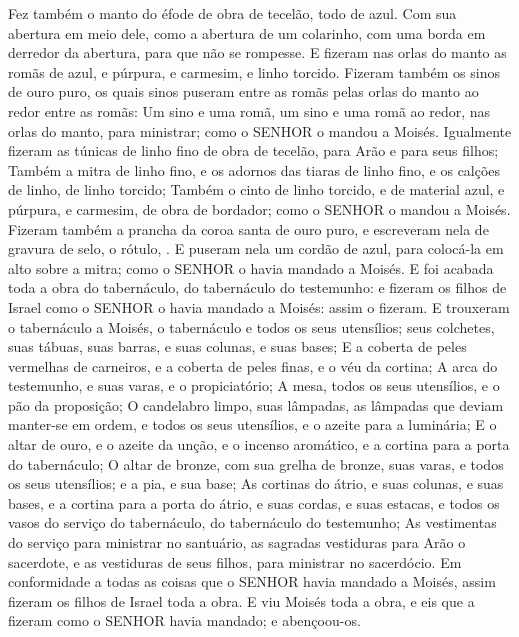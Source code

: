 {  Fez também o manto do éfode de obra de tecelão, todo de azul.
  Com sua abertura em meio dele, como a abertura de um colarinho, com uma borda em derredor da abertura, para que não se rompesse.
  E fizeram nas orlas do manto as romãs de azul, e púrpura, e carmesim, e linho torcido.
  Fizeram também os sinos de ouro puro, os quais sinos puseram entre as romãs pelas orlas do manto ao redor entre as romãs:
  Um sino e uma romã, um sino e uma romã ao redor, nas orlas do manto, para ministrar; como o SENHOR o mandou a Moisés.
  Igualmente fizeram as túnicas de linho fino de obra de tecelão, para Arão e para seus filhos;
  Também a mitra de linho fino, e os adornos das tiaras de linho fino, e os calções de linho, de linho torcido;
  Também o cinto de linho torcido, e de material azul, e púrpura, e carmesim, de obra de bordador; como o SENHOR o mandou a Moisés.
  Fizeram também a prancha da coroa santa de ouro puro, e escreveram nela de gravura de selo, o rótulo, .
  E puseram nela um cordão de azul, para colocá-la em alto sobre a mitra; como o SENHOR o havia mandado a Moisés.
  E foi acabada toda a obra do tabernáculo, do tabernáculo do testemunho: e fizeram os filhos de Israel como o SENHOR o havia mandado a Moisés: assim o fizeram.
  E trouxeram o tabernáculo a Moisés, o tabernáculo e todos os seus utensílios; seus colchetes, suas tábuas, suas barras, e suas colunas, e suas bases;
  E a coberta de peles vermelhas de carneiros, e a coberta de peles finas, e o véu da cortina;
  A arca do testemunho, e suas varas, e o propiciatório;
  A mesa, todos os seus utensílios, e o pão da proposição;
  O candelabro limpo, suas lâmpadas, as lâmpadas que deviam manter-se em ordem, e todos os seus utensílios, e o azeite para a luminária;
  E o altar de ouro, e o azeite da unção, e o incenso aromático, e a cortina para a porta do tabernáculo;
  O altar de bronze, com sua grelha de bronze, suas varas, e todos os seus utensílios; e a pia, e sua base;
  As cortinas do átrio, e suas colunas, e suas bases, e a cortina para a porta do átrio, e suas cordas, e suas estacas, e todos os vasos do serviço do tabernáculo, do tabernáculo do testemunho;
  As vestimentas do serviço para ministrar no santuário, as sagradas vestiduras para Arão o sacerdote, e as vestiduras de seus filhos, para ministrar no sacerdócio.
  Em conformidade a todas as coisas que o SENHOR havia mandado a Moisés, assim fizeram os filhos de Israel toda a obra.
  E viu Moisés toda a obra, e eis que a fizeram como o SENHOR havia mandado; e abençoou-os.
\par }

